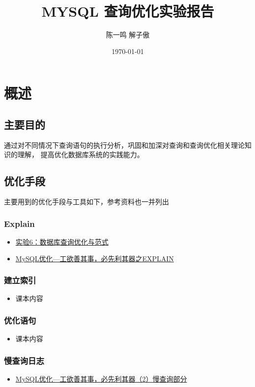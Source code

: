 \documentclass[11pt]{article}
\author{陈一鸣 解子傲}
\date{\today}
\title{MYSQL 查询优化实验报告}
\begin{document}
\maketitle
\tableofcontents

\section{概述}
\label{sec-1}
\subsection{主要目的}
\label{sec-1-1}
通过对不同情况下查询语句的执行分析，巩固和加深对查询和查询优化相关理论知识的理解，
提高优化数据库系统的实践能力。
\subsection{优化手段}
\label{sec-1-2}
主要用到的优化手段与工具如下，参考资料也一并列出
\subsubsection{Explain}
\label{sec-1-2-1}
\begin{itemize}
\item \href{http://cbb.sjtu.edu.cn/course/database/lab6.htm}{实验6：数据库查询优化与范式}
\item \href{http://www.cnblogs.com/magialmoon/p/3439042.html}{MySQL优化—工欲善其事，必先利其器之EXPLAIN}
\end{itemize}
\subsubsection{建立索引}
\label{sec-1-2-2}
\begin{itemize}
\item 课本内容
\end{itemize}
\subsubsection{优化语句}
\label{sec-1-2-3}
\begin{itemize}
\item 课本内容
\end{itemize}
\subsubsection{慢查询日志}
\label{sec-1-2-4}
\begin{itemize}
\item \href{http://www.cnblogs.com/zhanjindong/p/3472804.html#manchaxunrizhi}{MySQL优化—工欲善其事，必先利其器（2）慢查询部分}
\end{itemize}
\end{document}
